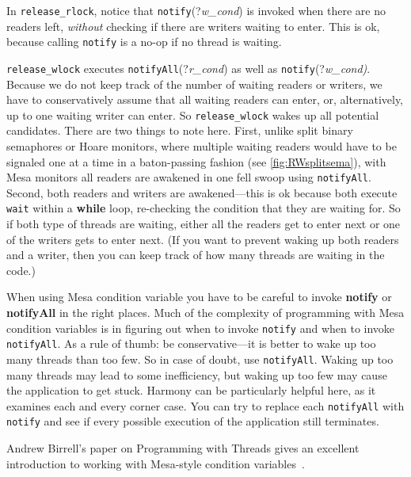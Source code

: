 \documentclass{report}
\begin{document}
In \texttt{release\_rlock}, notice that \texttt{notify}(?\textit{w\_cond})
is invoked when there are no readers left, \emph{without} checking
if there are writers waiting to enter.  This is
ok, because calling \texttt{notify} is a no-op if no thread is
waiting.

\texttt{release\_wlock} executes \texttt{notifyAll}(?\textit{r\_cond})
as well as \texttt{notify}(?\textit{w\_cond)}.  Because we
do not keep track of the number of waiting readers or writers, we
have to conservatively assume that all waiting readers can enter,
or, alternatively, up to one waiting writer can enter.  So
\texttt{release\_wlock} wakes up all potential candidates.  There
are two things to note here.  First, unlike split binary semaphores
or Hoare monitors, where multiple waiting readers would have to be
signaled one at a time in a baton-passing fashion (see
\autoref{fig:RWsplitsema}), with Mesa monitors all readers are
awakened in one fell swoop using \texttt{notifyAll}.  Second, both
readers and writers are awakened---this is ok because both execute
\texttt{wait} within a \textbf{while} loop, re-checking the condition
that they are waiting for.  So if both type of threads are waiting,
either all the readers get to enter next or one of the writers gets
to enter next.  (If you want to prevent waking up both readers and
a writer, then you can keep track of how many threads are waiting
in the code.)

When using Mesa condition variable you have to be careful to invoke
\textbf{notify} or \textbf{notifyAll} in the right places.
Much of the complexity of programming with Mesa condition variables
is in figuring out when to invoke \texttt{notify} and when to invoke
\texttt{notifyAll}.  As a rule of thumb: be conservative---it is
better to wake up too many threads than too few.
So in case of doubt, use \texttt{notifyAll}.
Waking up too
many threads may lead to some inefficiency, but waking up too few
may cause the application to get stuck.  Harmony can be particularly
helpful here, as it examines each and every corner case.
You can try to replace each \texttt{notifyAll} with \texttt{notify} and see
if every possible execution of the application still terminates.

Andrew Birrell's paper on Programming with Threads gives an excellent
introduction to working with Mesa-style condition variables~\cite{Birrell89}.
\end{document}
